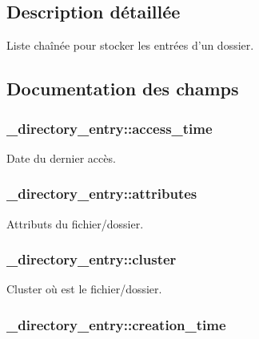 \subsection{Description détaillée}
Liste chaînée pour stocker les entrées d'un dossier. 

\subsection{Documentation des champs}
\hypertarget{struct__directory__entry_a27e1020c5262094ab3b58759da9660ae}{
\subsubsection[{access\-\_\-time}]{ \-\_\-directory\-\_\-entry\-::access\-\_\-time}}\label{struct__directory__entry_a27e1020c5262094ab3b58759da9660ae}
Date du dernier accès. \hypertarget{struct__directory__entry_a63da8f87e73a3eb30e55b2d405fa35d7}{
\subsubsection[{attributes}]{ \-\_\-directory\-\_\-entry\-::attributes}}\label{struct__directory__entry_a63da8f87e73a3eb30e55b2d405fa35d7}
Attributs du fichier/dossier. \hypertarget{struct__directory__entry_a8c70d9d0c2b2557cba83fb827d5c6e90}{
\subsubsection[{cluster}]{ \-\_\-directory\-\_\-entry\-::cluster}}\label{struct__directory__entry_a8c70d9d0c2b2557cba83fb827d5c6e90}
Cluster où est le fichier/dossier. \hypertarget{struct__directory__entry_a95f0f5ef18bf17f332bd0dc352d62ac4}{
\subsubsection[{creation\-\_\-time}]{ \-\_\-directory\-\_\-entry\-::creation\-\_\-time}}\label{struct__directory__entry_a95f0f5ef18bf17f332bd0dc352d62ac4}
